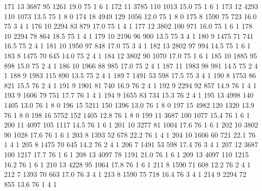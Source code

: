 \documentclass{article}
\begin{document}
\begin{Schunk}
\begin{Soutput}
171      13  3687  95 1261 19.0  75      1       6        1
172      11  3785 110 1013 15.0  75      1       6        1
173      12  4293 110 1073 13.5  75      1       8        0
174      18  4949 129 1056 12.0  75      1       8        0
175       8  1590  75  723 16.0  75      3       4        1
176      10  2294  83  879 17.0  75      1       4        1
177      12  3802 100  971 16.0  75      1       6        1
178      10  2294  78  864 18.5  75      1       4        1
179      10  2196  96  900 13.5  75      3       4        1
180       9  1475  71  741 16.5  75      2       4        1
181      10  1950  97  848 17.0  75      3       4        1
182      13  2802  97  994 14.5  75      1       6        1
183       8  1475  70  645 14.0  75      2       4        1
184      12  3802  90 1070 17.0  75      1       6        1
185      10  1885  95  898 15.0  75      2       4        1
186      10  1966  88  985 17.0  75      2       4        1
187      11  1983  98  981 14.5  75      2       4        1
188       9  1983 115  890 13.5  75      2       4        1
189       7  1491  53  598 17.5  75      3       4        1
190       8  1753  86  821 15.5  76      2       4        1
191       9  1901  81  740 16.9  76      2       4        1
192       9  2294  92  857 14.9  76      1       4        1
193       9  1606  79  751 17.7  76      1       4        1
194       9  1655  83  734 15.3  76      2       4        1
195      13  4998 140 1405 13.0  76      1       8        0
196      15  5211 150 1396 13.0  76      1       8        0
197      15  4982 120 1320 13.9  76      1       8        0
198      16  5752 152 1405 12.8  76      1       8        0
199      11  3687 100 1077 15.4  76      1       6        1
200      11  4097 105 1117 14.5  76      1       6        1
201      10  3277  81 1004 17.6  76      1       6        1
202      10  3802  90 1028 17.6  76      1       6        1
203       8  1393  52  678 22.2  76      1       4        1
204      10  1606  60  721 22.1  76      1       4        1
205       8  1475  70  645 14.2  76      2       4        1
206       7  1491  53  598 17.4  76      3       4        1
207      12  3687 100 1217 17.7  76      1       6        1
208      13  4097  78 1191 21.0  76      1       6        1
209      13  4097 110 1215 16.2  76      1       6        1
210      13  4228  95 1064 17.8  76      1       6        1
211       8  1590  71  608 12.2  76      2       4        1
212       7  1393  70  663 17.0  76      3       4        1
213       8  1590  75  718 16.4  76      3       4        1
214       9  2294  72  855 13.6  76      1       4        1

\end{Soutput}
\end{Schunk}
\end{document}

